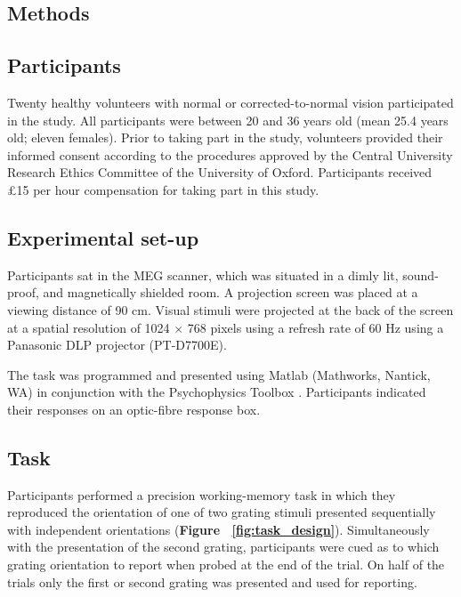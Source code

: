 \documentclass{article}
\begin{document}
\begin{normalsize}
\section{Methods}
\subsection{Participants}
Twenty healthy volunteers with normal or corrected-to-normal vision participated in the study. All participants were between 20 and 36 years old (mean 25.4 years old; eleven females). Prior to taking part in the study, volunteers provided their informed consent according to the procedures approved by the Central University Research Ethics Committee of the University of Oxford. Participants received \pounds15 per hour compensation for taking part in this study.\\

\subsection{Experimental set-up}
Participants sat in the MEG scanner, which was situated in a dimly lit, sound-proof, and magnetically shielded room. A projection screen was placed at a viewing distance of 90 cm. Visual stimuli were projected at the back of the screen at a spatial resolution of 1024 $\times$ 768 pixels using a refresh rate of 60 Hz using a Panasonic DLP projector (PT-D7700E). 

The task was programmed and presented using Matlab (Mathworks, Nantick, WA) in conjunction with the Psychophysics Toolbox \parencite{Brainard1997}. Participants indicated their responses on an optic-fibre response box.\\

\subsection{Task}
Participants performed a precision working-memory task in which they reproduced the orientation of one of two grating stimuli presented sequentially with independent orientations (\textbf{Figure ~\ref{fig:task_design}}). Simultaneously with the presentation of the second grating, participants were cued as to which grating orientation to report when probed at the end of the trial. On half of the trials only the first or second grating was presented and used for reporting. 


\end{normalsize}
\end{document}

